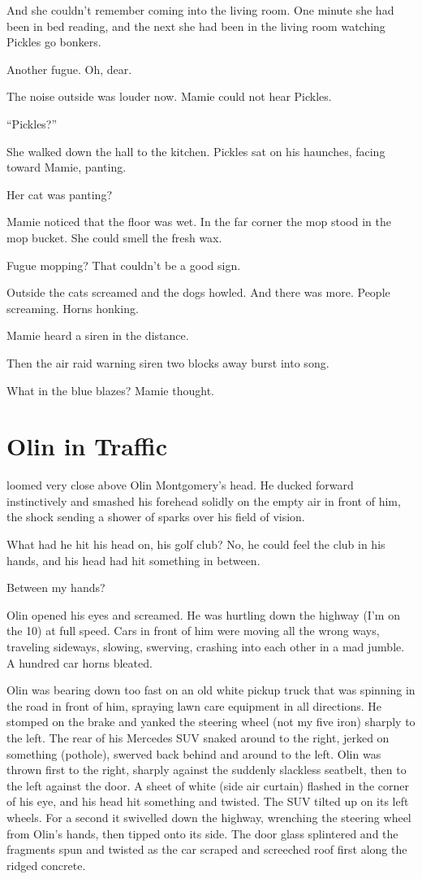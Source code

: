 And she couldn’t remember coming into the living room. One minute she had been in bed reading, and the next she had been in the living room watching Pickles go bonkers.

Another fugue. Oh, dear.

The noise outside was louder now. Mamie could not hear Pickles.

“Pickles?”

She walked down the hall to the kitchen. Pickles sat on his haunches, facing toward Mamie, panting.

Her cat was panting?

Mamie noticed that the floor was wet. In the far corner the mop stood in the mop bucket. She could smell the fresh wax.

Fugue mopping? That couldn’t be a good sign.

Outside the cats screamed and the dogs howled. And there was more. People screaming. Horns honking.

Mamie heard a siren in the distance.

Then the air raid warning siren two blocks away burst into song.

What in the blue blazes? Mamie thought.



\section{Olin in Traffic}

 loomed very close above Olin Montgomery’s head. He ducked forward instinctively and smashed his forehead solidly on the empty air in front of him, the shock sending a shower of sparks over his field of vision.

What had he hit his head on, his golf club? No, he could feel the club in his hands, and his head had hit something in between.

Between my hands?

Olin opened his eyes and screamed. He was hurtling down the highway (I’m on the 10) at full speed. Cars in front of him were moving all the wrong ways, traveling sideways, slowing, swerving, crashing into each other in a mad jumble. A hundred car horns bleated.

Olin was bearing down too fast on an old white pickup truck that was spinning in the road in front of him, spraying lawn care equipment in all directions. He stomped on the brake and yanked the steering wheel (not my five iron) sharply to the left. The rear of his Mercedes SUV snaked around to the right, jerked on something (pothole), swerved back behind and around to the left. Olin was thrown first to the right, sharply against the suddenly slackless seatbelt, then to the left against the door. A sheet of white (side air curtain) flashed in the corner of his eye, and his head hit something and twisted. The SUV tilted up on its left wheels. For a second it swivelled down the highway, wrenching the steering wheel from Olin’s hands, then tipped onto its side. The door glass splintered and the fragments spun and twisted as the car scraped and screeched roof first along the ridged concrete.

